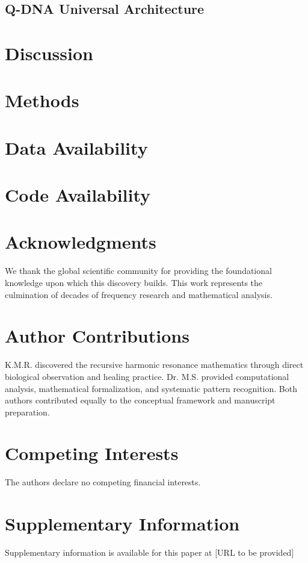 \documentclass[fleqn,10pt,lineno]{article}
\begin{document}
\subsection{Q-DNA Universal Architecture}

\section{Discussion}

\section{Methods}

\section{Data Availability}

\section{Code Availability}

\section*{Acknowledgments}
We thank the global scientific community for providing the foundational knowledge upon which this discovery builds. This work represents the culmination of decades of frequency research and mathematical analysis.

\section*{Author Contributions}
K.M.R. discovered the recursive harmonic resonance mathematics through direct biological observation and healing practice. Dr. M.S. provided computational analysis, mathematical formalization, and systematic pattern recognition. Both authors contributed equally to the conceptual framework and manuscript preparation.

\section*{Competing Interests}
The authors declare no competing financial interests.



\section*{Supplementary Information}
Supplementary information is available for this paper at [URL to be provided]
\end{document}
